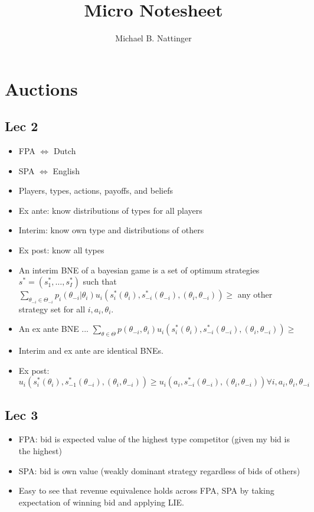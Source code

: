 \documentclass[11pt]{article} %
\title{Micro Notesheet}
\author{Michael B. Nattinger}
\begin{document}
\maketitle

\section{Auctions}
\subsection{Lec 2}
\begin{itemize}
\item FPA $\iff$ Dutch
\item SPA $\iff$ English
\item Players, types, actions, payoffs, and beliefs
\item Ex ante: know distributions of types for all players
\item Interim: know own type and distributions of others
\item Ex post: know all types
\item An interim BNE of a bayesian game is  a set of optimum strategies $s^* = (s^*_1,\dots,s^*_I)$ such that $\sum_{\theta_{-i}\in \Theta_{-i}} p_i(\theta_{-i}|\theta_i)u_i(s_i^*(\theta_i),s_{-i}^*(\theta_{-i}),(\theta_i,\theta_{-i})) \geq $ any other strategy set for all  $i,a_i,\theta_i$.
\item An ex ante BNE ... $\sum_{\theta\in \Theta} p(\theta_{-i},\theta_i)u_i(s_i^*(\theta_i),s_{-i}^*(\theta_{-i}),(\theta_i,\theta_{-i})) \geq $
\item Interim and ex ante are identical BNEs. 
\item Ex post: $u_i(s_i^*(\theta_i),s_{-1}^*(\theta_{-i}),(\theta_i,\theta_{-i})) \geq u_i(a_i,s_{-i}^*(\theta_{-i}),(\theta_i,\theta_{-i}))\forall i,a_i,\theta_i,\theta_{-i}$
\end{itemize}

\subsection{Lec 3}
\begin{itemize}
\item FPA: bid is expected value of the highest type competitor (given my bid is the highest)
\item SPA: bid is own value (weakly dominant strategy regardless of bids of others)
\item Easy to see that revenue equivalence holds across FPA, SPA by taking expectation of winning bid and applying LIE.
\end{itemize}
\end{document}
